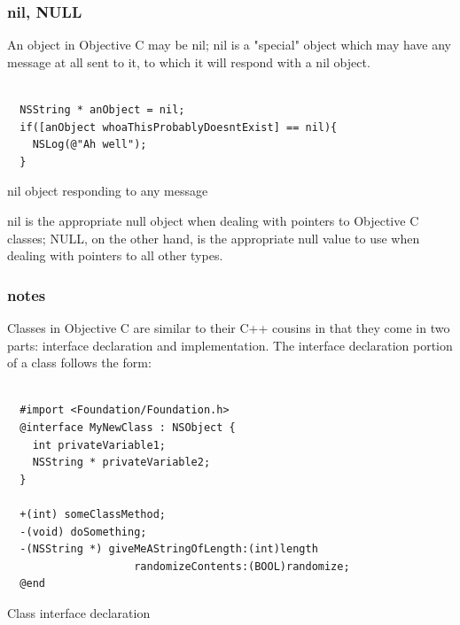 \documentclass[10pt]{beamer}
\begin{document}
    
\begin{frame}[fragile]
  \frametitle{nil, NULL}
  An object in Objective C may be nil; nil is a "special" object which may have any message at all sent to it, to which it will respond with a nil object.
\begin{listing}[H]
    \begin{verbatim}

  NSString * anObject = nil;
  if([anObject whoaThisProbablyDoesntExist] == nil){
    NSLog(@"Ah well");
  }

  \end{verbatim}
    \caption{nil object responding to any message}
    \label{listing:5}
  \end{listing}

nil is the appropriate null object when dealing with pointers to Objective C classes; NULL, on the other hand, is the appropriate null value to use when dealing with pointers to all other types.

\end{frame}

    
\begin{frame}[fragile]
  \frametitle{notes}
  Classes in Objective C are similar to their C++ cousins in that they come in two parts: interface declaration and implementation. The interface declaration portion of a class follows the form:
\begin{listing}[H]
    \begin{verbatim}

  #import <Foundation/Foundation.h>
  @interface MyNewClass : NSObject {
    int privateVariable1;
    NSString * privateVariable2;
  }

  +(int) someClassMethod;
  -(void) doSomething;
  -(NSString *) giveMeAStringOfLength:(int)length
                    randomizeContents:(BOOL)randomize;
  @end

  \end{verbatim}
    \caption{Class interface declaration}
    \label{listing:6}
  \end{listing}

\end{frame}
\end{document}
